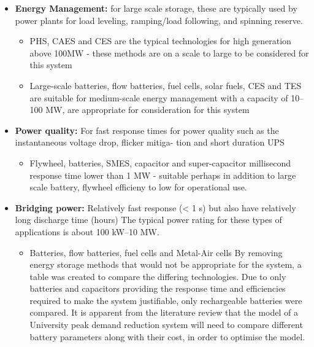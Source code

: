 \begin{itemize}
\tightlist
\item
  \textbf{Energy Management:} for large scale storage, these are
  typically used by power plants for load leveling, ramping/load
  following, and spinning reserve.

  \begin{itemize}
  \tightlist
  \item
    PHS, CAES and CES are the typical technologies for high generation
    above 100MW - these methods are on a scale to large to be considered
    for this system
  \item
    Large-scale batteries, flow batteries, fuel cells, solar fuels, CES
    and TES are suitable for medium-scale energy management with a
    capacity of 10--100 MW, are appropriate for consideration for this
    system
  \end{itemize}
\item
  \textbf{Power quality:} For fast response times for power quality such
  as the instantaneous voltage drop, flicker mitiga- tion and short
  duration UPS

  \begin{itemize}
  \tightlist
  \item
    Flywheel, batteries, SMES, capacitor and super-capacitor millisecond
    response time lower than 1 MW - suitable perhaps in addition to
    large scale battery, flywheel efficieny to low for operational use.
  \end{itemize}
\item
  \textbf{Bridging power:} Relatively fast response (\textless{} 1 s)
  but also have relatively long discharge time (hours) The typical power
  rating for these types of applications is about 100 kW--10 MW.

  \begin{itemize}
  \tightlist
  \item
    Batteries, flow batteries, fuel cells and Metal-Air cells
    \cite{Chen2009291} By removing energy storage methods that would not
    be appropriate for the system, a table was created to compare the
    differing technologies. Due to only batteries and capacitors
    providing the response time and efficiencies required to make the
    system justifiable, only rechargeable batteries were compared. It is
    apparent from the literature review that the model of a University
    peak demand reduction system will need to compare different battery
    parameters along with their cost, in order to optimise the model.
  \end{itemize}
\end{itemize}

